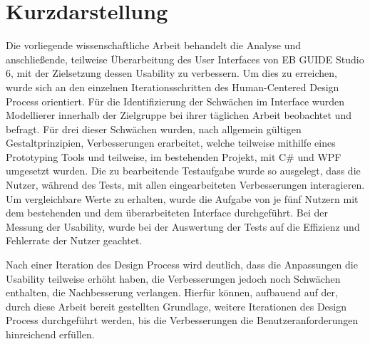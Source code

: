 \thispagestyle{empty}
\section*{Kurzdarstellung}
\label{sec:kurzdarstellung}

Die vorliegende wissenschaftliche Arbeit behandelt die Analyse und anschließende, teilweise Überarbeitung des User Interfaces von EB GUIDE Studio 6, mit der Zielsetzung dessen Usability zu verbessern.
Um dies zu erreichen, wurde sich an den einzelnen Iterationsschritten des Human-Centered Design Process orientiert.
Für die Identifizierung der Schwächen im Interface wurden Modellierer innerhalb der Zielgruppe bei ihrer täglichen Arbeit beobachtet und befragt.
Für drei dieser Schwächen wurden, nach allgemein gültigen Gestaltprinzipien, Verbesserungen erarbeitet, welche teilweise mithilfe eines Prototyping Tools und teilweise, im bestehenden Projekt, mit C\# und WPF umgesetzt wurden.
Die zu bearbeitende Testaufgabe wurde so ausgelegt, dass die Nutzer, während des Tests, mit allen eingearbeiteten Verbesserungen interagieren.
Um vergleichbare Werte zu erhalten, wurde die Aufgabe von je fünf Nutzern mit dem bestehenden und dem überarbeiteten Interface durchgeführt.
Bei der Messung der Usability, wurde bei der Auswertung der Tests auf die Effizienz und Fehlerrate der Nutzer geachtet.

Nach einer Iteration des Design Process wird deutlich, dass die Anpassungen die Usability teilweise erhöht haben, die Verbesserungen jedoch noch Schwächen enthalten, die Nachbesserung verlangen.
Hierfür können, aufbauend auf der, durch diese Arbeit bereit gestellten Grundlage, weitere Iterationen des Design Process durchgeführt werden, bis die Verbesserungen die Benutzeranforderungen hinreichend erfüllen.


